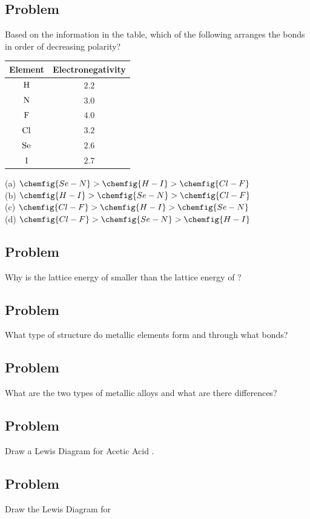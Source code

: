 \documentclass{article}
\begin{document}
\subsection*{Problem \countThis}
Based on the information in the table, which of the following arranges the bonds in order of decreasing polarity? \\
\begin{center}
\begin{tabular}{|cc|}
    \hline 
    Element & Electronegativity \\ [0.5 ex]
    \hline \hline
    \(\ce{H}\) & \(2.2\)\\
    \(\ce{N}\) & \(3.0\) \\
    \(\ce{F}\) & \(4.0\) \\
    \(\ce{Cl}\) & \(3.2\) \\
    \(\ce{Se}\) & \(2.6\) \\
    \(\ce{I}\) & \(2.7\)\\ [1ex]
    \hline
\end{tabular}
\end{center} 
(a) \(\chemfig{Se-N} > \chemfig{H-I} > \chemfig{Cl-F}\) \\
(b) \(\chemfig{H-I} > \chemfig{Se-N} >\chemfig{Cl-F}\)\\
(c) \(\chemfig{Cl-F} > \chemfig{H-I} > \chemfig{Se-N}\)\\
(d) \(\chemfig{Cl-F} > \chemfig{Se-N} > \chemfig{H-I}\)
\subsection*{Problem \countThis}
Why is the lattice energy of  smaller than the lattice energy of ?
\subsection*{Problem \countThis}
What type of structure do metallic elements form and through what bonds? 
\subsection*{Problem \countThis}
What are the two types of metallic alloys and what are there differences?
\subsection*{Problem \countThis}
Draw a Lewis Diagram for Acetic Acid .
\subsection*{Problem \countThis}
Draw the Lewis Diagram for 
\end{document}
